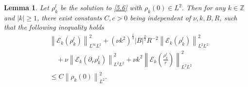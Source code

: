 \documentclass[final, 12pt,reqno]{amsart}
\newtheorem{lemma}[theorem]{\bf Lemma}
\numberwithin{equation}{section}
\begin{document}
\begin{lemma}\label{lem5.5}
Let $\rho_k^l$ be the solution to \eqref{5.6} with $\rho_k(0) \in L^2$. Then for any $k \in \mathbb{Z}$ and $|k| \geq 1$, there exist constants $C, c>0$ being independent of $\nu, k, B, R$, such that the following inequality holds
    $$
    \begin{aligned}
    &   \left\|\mathcal{E}_k(\rho_k^l)\right\|_{L^\infty L^2}^2 +\left(\nu k^2\right)^{\frac{1}{3}}|B|^{\frac{2}{3}} R^{-2}\left\|\mathcal{E}_k (\rho_k^l)\right\|_{L^2 L^2}^2\\
    &\quad+ \nu\left\|\mathcal{E}_k(\partial_{r}\rho_k^l)\right\|_{L^2L^2}^2 +\nu k^2\left\|\mathcal{E}_k(\frac{\rho_k^l}{r})\right\|_{L^2L^2}^2\\
    &\leq C\left\|\rho_k(0)\right\|_{L^2}^2.
        \end{aligned}
    $$
\end{lemma}
\end{document}
